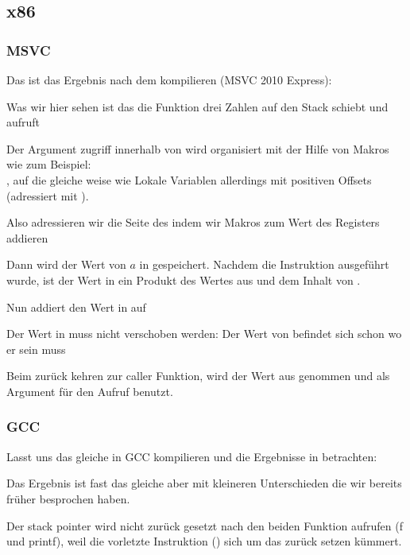 \subsection{x86}

\subsubsection{MSVC}

Das ist das Ergebnis nach dem kompilieren (MSVC 2010 Express):




Was wir hier sehen ist das die \main Funktion drei Zahlen auf den Stack schiebt und  aufruft

Der Argument zugriff innerhalb von \ttf wird organisiert mit der Hilfe von Makros wie zum Beispiel:\\
, 
auf die gleiche weise wie Lokale Variablen allerdings mit positiven Offsets (adressiert mit ).

Also adressieren wir die  Seite des  indem wir  Makros zum Wert des \EBP Registers addieren  


Dann wird der Wert von $a$ in \EAX gespeichert. Nachdem die \IMUL Instruktion ausgeführt wurde, ist
der Wert in \EAX ein Produkt des Wertes aus \EAX und dem Inhalt von .

Nun addiert \ADD den Wert in  auf \EAX

Der Wert in \EAX muss nicht verschoben werden: Der Wert von \EAX befindet sich schon wo er sein muss

Beim zurück kehren zur \gls{caller} Funktion, wird der Wert aus \EAX genommen und als Argument 
für den \printf Aufruf benutzt.




\subsubsection{GCC}


Lasst uns das gleiche in GCC kompilieren und die Ergebnisse in \IDA betrachten:



Das Ergebnis ist fast das gleiche aber mit kleineren Unterschieden die wir bereits früher
besprochen haben.

Der \gls{stack pointer} wird nicht zurück gesetzt nach den beiden Funktion aufrufen (f und printf),
weil die vorletzte  Instruktion () sich um das zurück setzen kümmert.
